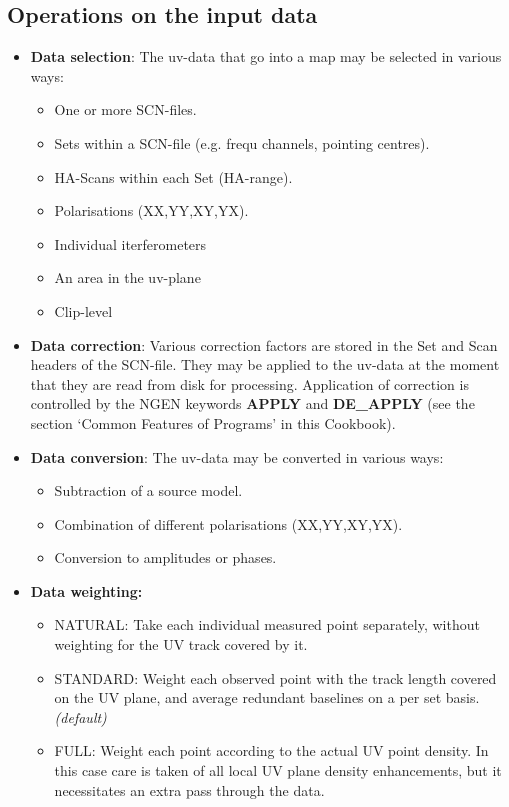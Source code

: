 \subsection{Operations on the input data}
\label{.make.input}



\begin{itemize}
\item {\bf Data selection}: The uv-data that go into a map may be
selected in various ways:
  \begin{itemize}
  \item One or more SCN-files.
  \item Sets within a SCN-file (e.g. frequ channels, pointing centres).
  \item HA-Scans within each Set (HA-range).
  \item Polarisations (XX,YY,XY,YX).
  \item Individual iterferometers
  \item An area in the uv-plane
  \item Clip-level
  \end{itemize}

\item {\bf Data correction}:
Various correction factors are stored in the Set and Scan headers of the
SCN-file. They may be applied to the uv-data at the moment that they are
read from disk for processing. Application of correction is controlled
by the NGEN keywords {\bf APPLY} and {\bf DE\_APPLY}
(see the section `Common Features of \NEWSTAR Programs' in this Cookbook).

\item {\bf Data conversion}:
The uv-data may be converted in various ways:
  \begin{itemize}
  \item Subtraction of a source model.
  \item Combination of different polarisations (XX,YY,XY,YX).
  \item Conversion to amplitudes or phases.
  \end{itemize}

\item {\bf Data weighting:}
  \begin{itemize}
  \item {  NATURAL:}  Take each individual measured point separately,
			without weighting for the UV track covered by it.
  \item {  STANDARD:} Weight each observed point with the track length covered
			on the UV plane,
			and average redundant baselines on a per set basis.
  {\it (default)}
  \item {  FULL:}     Weight each point according to the actual UV point
			density. In this case care is taken of all local UV
			plane density enhancements,
			but it necessitates an extra pass through the data.
  \end{itemize}


\end{itemize}
